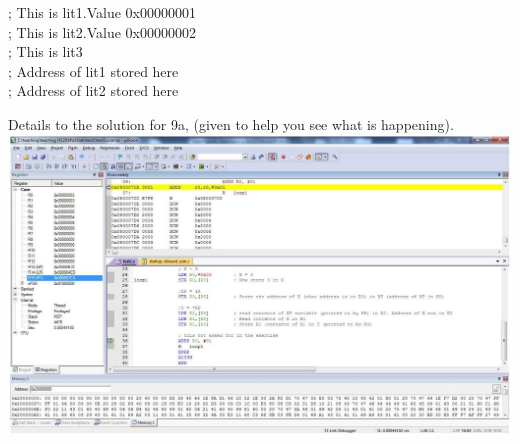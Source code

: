 \documentclass[10pt]{article}
\begin{document}
; This is lit1.Value 0x00000001\\
; This is lit2.Value 0x00000002\\
; This is lit3\\
; Address of lit1 stored here\\
; Address of lit2 stored here

Details to the solution for 9a, (given to help you see what is happening).\\
\includegraphics[width=\linewidth]{images/2025_01_02_eeffad754b73de6041b6g-10}
\end{document}
